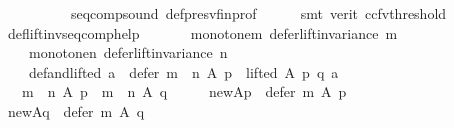 \begin{isabellebody}
\ \ \ \ \ \ \ \ \ \ seq{\isacharunderscore}{\kern0pt}comp{\isacharunderscore}{\kern0pt}sound\ def{\isacharunderscore}{\kern0pt}presv{\isacharunderscore}{\kern0pt}fin{\isacharunderscore}{\kern0pt}prof\isanewline
\ \ \ \ \isamarkupfalse%
\ {\isacharparenleft}{\kern0pt}smt\ {\isacharparenleft}{\kern0pt}verit{\isacharcomma}{\kern0pt}\ ccfv{\isacharunderscore}{\kern0pt}threshold{\isacharparenright}{\kern0pt}{\isacharparenright}{\kern0pt}\isanewline
{}\isamarkupfalse%
%
\endisatagproof
{\isafoldproof}%
%
\isadelimproof
\isanewline
%
\endisadelimproof
\isanewline
{}\isamarkupfalse%
\ def{\isacharunderscore}{\kern0pt}lift{\isacharunderscore}{\kern0pt}inv{\isacharunderscore}{\kern0pt}seq{\isacharunderscore}{\kern0pt}comp{\isacharunderscore}{\kern0pt}help{\isacharcolon}{\kern0pt}\isanewline
\ \ \isanewline
\ \ \ \ monotone{\isacharunderscore}{\kern0pt}m{\isacharcolon}{\kern0pt}\ {\isachardoublequoteopen}defer{\isacharunderscore}{\kern0pt}lift{\isacharunderscore}{\kern0pt}invariance\ m{\isachardoublequoteclose}\ \isanewline
\ \ \ \ monotone{\isacharunderscore}{\kern0pt}n{\isacharcolon}{\kern0pt}\ {\isachardoublequoteopen}defer{\isacharunderscore}{\kern0pt}lift{\isacharunderscore}{\kern0pt}invariance\ n{\isachardoublequoteclose}\ \isanewline
\ \ \ \ def{\isacharunderscore}{\kern0pt}and{\isacharunderscore}{\kern0pt}lifted{\isacharcolon}{\kern0pt}\ {\isachardoublequoteopen}a\ {\isasymin}\ {\isacharparenleft}{\kern0pt}defer\ {\isacharparenleft}{\kern0pt}m\ {\isasymtriangleright}\ n{\isacharparenright}{\kern0pt}\ A\ p{\isacharparenright}{\kern0pt}\ {\isasymand}\ lifted\ A\ p\ q\ a{\isachardoublequoteclose}\isanewline
\ \ \ {\isachardoublequoteopen}{\isacharparenleft}{\kern0pt}m\ {\isasymtriangleright}\ n{\isacharparenright}{\kern0pt}\ A\ p\ {\isacharequal}{\kern0pt}\ {\isacharparenleft}{\kern0pt}m\ {\isasymtriangleright}\ n{\isacharparenright}{\kern0pt}\ A\ q{\isachardoublequoteclose}\isanewline
%
\isadelimproof
%
\endisadelimproof
%
\isatagproof
{}\isamarkupfalse%
\ {\isacharminus}{\kern0pt}\isanewline
\ \ \isamarkupfalse%
\ {\isacharquery}{\kern0pt}new{\isacharunderscore}{\kern0pt}Ap\ {\isacharequal}{\kern0pt}\ {\isachardoublequoteopen}defer\ m\ A\ p{\isachardoublequoteclose}\isanewline
\ \ \isamarkupfalse%
\ {\isacharquery}{\kern0pt}new{\isacharunderscore}{\kern0pt}Aq\ {\isacharequal}{\kern0pt}\ {\isachardoublequoteopen}defer\ m\ A\ q{\isachardoublequoteclose}\isanewline
\ \ \isamarkupfalse%

\end{isabellebody}
